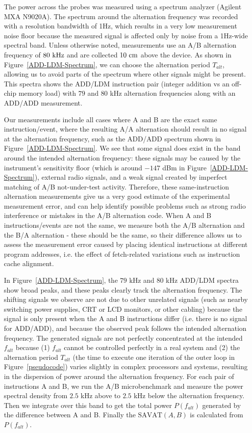 The power across the probes was measured using a spectrum analyzer (Agilent MXA N9020A). The spectrum around the alternation frequency was re\-cor\-ded with a resolution bandwidth of 1Hz, which results in a very low measurement noise floor because the measured signal is affected only by noise from a 1Hz-wide spectral band. Unless otherwise noted, measurements use an A/B alternation frequency of $80~{\rm kHz}$ and are collected $10~{\rm cm}$ above the device. %
As shown in Figure~\ref{ADD-LDM-Spectrum}, we can choose the alternation period $T_{alt}$, allowing us to avoid parts of the spectrum where other signals might be present. This spectra shows the ADD/LDM instruction pair (integer addition vs an off-chip memory load) with $79$ and $80$ kHz alternation frequencies along with an ADD/ADD measurement. 

Our measurements include all cases where A and B are the exact same instruction/event, where the resulting A/A alternation should result in no signal at the alternation frequency, such as the ADD/ADD spectrum shown in Figure~\ref{ADD-LDM-Spectrum}. We see that some signal does exist in the band around the intended alternation frequency: these signals may be caused by the instrument's sensitivity floor (which is around $-147$ dBm in Figure~\ref{ADD-LDM-Spectrum}), external radio signals, and a weak signal created by imperfect matching of A/B not-under-test activity. Therefore, these same-instruction alternation measurements give us a very good estimate of the experimental measurement error, and can help identify possible problems such as strong radio interference or mistakes in the A/B alternation code. When A and B instructions/events are not the same, we measure both the A/B alternation and the B/A alternation - these should be the same, so their difference allows us to assess the measurement error caused by placing identical instructions at different program addresses, i.e. the effect of fetch-related variations such as instruction cache alignment.

In Figure~\ref{ADD-LDM-Spectrum}, the $79$ kHz and $80$ kHz ADD/LDM spectra show broad peaks, and these peaks clearly track the alternation frequency. The shifting signals we observe are not due to other unrelated signals (such as nearby switching power supplies, CRT or LCD monitors, or other cabling) because the signal is only present when the A and B instructions differ (i.e. there is no signal for ADD/ADD), and because the observed peak follows the intended alternation frequency. The generated signals are not perfectly concentrated at the intended $f_{alt}$ because (1) $f_{alt}$ cannot be controlled perfectly in a real system and (2) the alternation period $T_{alt}$ (the time to execute one iteration of the outer loop in Figure~\ref{pseudocode}) varies slightly in complex processors and systems, resulting in the dispersion of power around the alternation frequency. For each pair of instructions A and B, we run the A/B microbenchmark and measure the power spectral density from $2.5$ kHz above to $2.5$ kHz below the alternation frequency. Then we integrate over this band to get the total power $P(f_{alt})$ generated by the difference between A and B. Finally the $\textrm{SAVAT}(A,B)$ is calculated from $P(f_{alt})$. 

